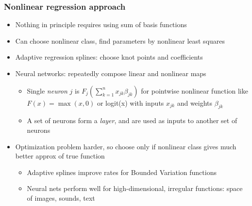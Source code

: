 \documentclass[bigger]{beamer}
\begin{document}
\begin{frame}%

\frametitle{Nonlinear regression approach}

\begin{itemize}
\item Nothing in principle requires using sum of basis functions
\item Can choose nonlinear class, find parameters by nonlinear least squares
\item Adaptive regression splines: choose knot points and coefficients
\item Neural networks: repeatedly compose linear and nonlinear maps
\begin{itemize}
\item Single \emph{neuron} $j$ is $F_j(\sum_{k=1}^{n}x_{jk}\beta_{jk})$ for pointwise nonlinear function like $F(x)=\max(x,0)$ or logit(x) with inputs $x_{jk}$ and weights $\beta_{jk}$
\item A set of neurons form a \emph{layer}, and are used as inputs to another set of neurons
\end{itemize}
\item Optimization problem harder, so choose only if nonlinear class gives much better approx of true function
\begin{itemize}
\item Adaptive splines improve rates for Bounded Variation functions
\item Neural nets perform well for high-dimensional, irregular functions: space of images, sounds, text
\end{itemize}

\end{itemize}

\end{frame}%
\end{document}
